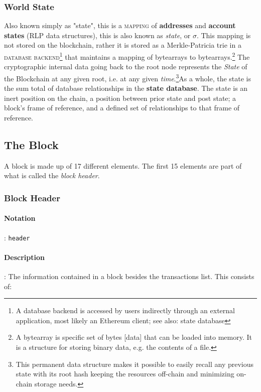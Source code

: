 \documentclass[10pt,a4paper,leqno,bibliography=totoc]{scrartcl}
\newenvironment{alphafootnotes}
{\par\edef\savedfootnotenumber{\number\value{footnote}}
\renewcommand{\thefootnote}{\alph{footnote}}
\setcounter{footnote}{0}}
{\par\setcounter{footnote}{\savedfootnotenumber}}
\begin{document}
\begin{alphafootnotes}
\begin{multicols*}{2}
				\subsubsection{World State}
					Also known simply as "state", this is a \textsc{mapping} of \textbf{addresses} and \textbf{account states} (RLP data structures), this is also known as \textit{state}, or $\sigma$. This mapping is not stored on the blockchain, rather it is stored as a Merkle-Patricia \gls{trie} in a \textsc{database backend}\footnote{A database backend is accessed by users indirectly through an external application, most likely an Ethereum client; see also: \gls{state database}} that maintains a mapping of bytearrays to bytearrays.\footnote{A bytearray is specific set of bytes [data] that can be loaded into memory. It is a structure for storing binary data, e.g. the contents of a file.} The cryptographic internal data going back to the \gls{root node} represents the \textit{State} of the Blockchain at any given root, i.e. at any given \textit{time}.\footnote{This permanent data structure makes it possible to easily recall any previous state with its root hash keeping the resources off-chain and minimizing on-chain storage needs.}As a whole, the state is the sum total of database relationships in the \textbf{ \gls{state database}}. The state is an inert position on the chain, a position between prior state and post state; a block's frame of reference, and a defined set of relationships to that frame of reference.


		\subsection{The Block}
			A block is made up of 17 different elements. The first 15 elements are part of what is called the \textsl{block header}.


				\subsubsection{Block Header}
				\paragraph{Notation}: \texttt{header} 
				\paragraph{Description}: The information contained in a block besides the transactions list. This consists of:


\end{multicols*}
\end{alphafootnotes}
\end{document}
